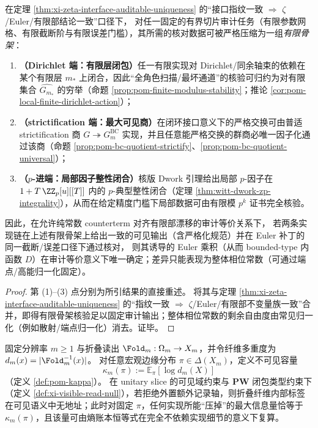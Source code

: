 \begin{corollary}\label{cor:xi-finite-skeleton-euler-uniqueness}
在定理 \ref{thm:xi-zeta-interface-auditable-uniqueness} 的“接口指纹一致 \(\Rightarrow\) \(\zeta\)/Euler/有限部结论一致”口径下，
对任一固定的有界切片审计任务（有限参数网格、有限截断阶与有限误差门槛），其所需的核对数据可被严格压缩为一组\emph{有限骨架}：
\begin{enumerate}
  \item \textbf{（Dirichlet 端：有限层闭包）}任一有限实现对 Dirichlet/同余轴束的依赖在某个有限层 \(m_\ast\) 上闭合，因此“全角色扫描/最坏通道”的核验可归约为对有限集合 \(\widehat{G_{m_\ast}}\) 的穷举（命题 \ref{prop:pom-finite-modulus-stability}；推论 \ref{cor:pom-local-finite-dirichlet-action}）；
  \item \textbf{（strictification 端：最大可见商）}在闭环接口意义下的严格交换可由普适 strictification 商 \(G\twoheadrightarrow G^{\mathrm{BC}}_{m}\) 实现，并且任意能严格交换的群商必唯一因子化通过该商（命题 \ref{prop:pom-bc-quotient-strictify}、\ref{prop:pom-bc-quotient-universal}）；
  \item \textbf{（\(p\)-进端：局部因子整性闭合）}核版 Dwork 引理给出局部 \(p\)-因子在 \(1+T\,\ZZ_p[u][[T]]\) 内的 \(p\)-典型整性闭合（定理 \ref{thm:witt-dwork-zp-integrality}），从而在给定精度门槛下局部数据可由有限模 \(p^k\) 证书完全核验。
\end{enumerate}
因此，在允许纯常数 counterterm 对齐有限部漂移的审计等价关系下，
若两条实现链在上述有限骨架上给出一致的可见输出（含严格化规范）并在 Euler 补丁的同一截断/误差口径下通过核对，
则其诱导的 Euler 乘积（从而 bounded-type 内函数 \(D\)）在审计等价意义下唯一确定；差异只能表现为整体相位常数（可通过端点/高能归一化固定）。
\end{corollary}
\begin{proof}
第 (1)–(3) 点分别为所引结果的直接重述。
将其与定理 \ref{thm:xi-zeta-interface-auditable-uniqueness} 的“指纹一致 \(\Rightarrow\) \(\zeta\)/Euler/有限部不变量族一致”合并，即得有限骨架核验足以固定审计输出；整体相位常数的剩余自由度由常见归一化（例如散射/端点归一化）消去。证毕。
\end{proof}

\begin{theorem}\label{thm:xi-kappa-unique-carrier}
固定分辨率 \(m\ge 1\) 与折叠读出 \(\Fold_m:\Omega_m\to X_m\)，并令纤维多重度为 \(d_m(x)=|\Fold_m^{-1}(x)|\)。
对任意宏观边缘分布 \(\pi\in\Delta(X_m)\)，定义不可见容量
\[
\kappa_m(\pi):=\mathbb{E}_{\pi}[\log d_m(X)]
\]
（定义 \ref{def:pom-kappa}）。
在 unitary slice 的可见域约束与 \(\mathbf{PW}\) 闭包类型约束下（定义 \ref{def:xi-visible-read-null}），若拒绝外置额外记录轴，则折叠纤维内部标签在可见语义中无地址；此时对固定 \(\pi\)，任何实现所能“压掉”的最大信息量恰等于 \(\kappa_m(\pi)\)，且该量可由熵账本恒等式在完全不依赖实现细节的意义下复算。
\end{theorem}

